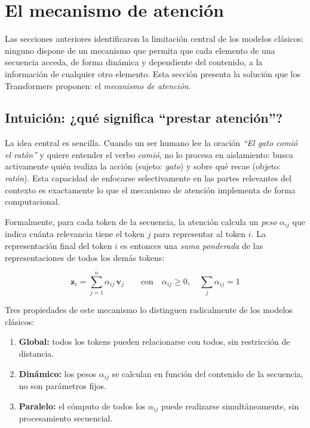 \section{El mecanismo de atención}
\label{sec:mecanismo_atencion}

Las secciones anteriores identificaron la limitación central de los modelos
clásicos: ninguno dispone de un mecanismo que permita que cada elemento de
una secuencia acceda, de forma dinámica y dependiente del contenido, a la
información de cualquier otro elemento. Esta sección presenta la solución
que los Transformers proponen: el \textit{mecanismo de atención}.

\subsection{Intuición: ¿qué significa ``prestar atención''?}
\label{subsec:atencion_intuicion}

La idea central es sencilla. Cuando un ser humano lee la oración
\textit{``El gato comió el ratón''} y quiere entender el verbo
\textit{comió}, no lo procesa en aislamiento: busca activamente quién
realiza la acción (sujeto: \textit{gato}) y sobre qué recae (objeto:
\textit{ratón}). Esta capacidad de enfocarse selectivamente en las partes
relevantes del contexto es exactamente lo que el mecanismo de atención
implementa de forma computacional.

Formalmente, para cada token de la secuencia, la atención calcula un
\textit{peso} $\alpha_{ij}$ que indica cuánta relevancia tiene el token $j$
para representar al token $i$. La representación final del token $i$ es
entonces una \textit{suma ponderada} de las representaciones de todos los
demás tokens:

\begin{equation}
    \bm{z}_i = \sum_{j=1}^{n} \alpha_{ij}\, \bm{v}_j
    \qquad \text{con} \quad \alpha_{ij} \geq 0, \quad \sum_j \alpha_{ij} = 1
\end{equation}



Tres propiedades de este mecanismo lo distinguen radicalmente de los modelos
clásicos:

\begin{enumerate}
    \item \textbf{Global:} todos los tokens pueden relacionarse con todos,
    sin restricción de distancia.
    \item \textbf{Dinámico:} los pesos $\alpha_{ij}$ se calculan en función
    del contenido de la secuencia, no son parámetros fijos.
    \item \textbf{Paralelo:} el cómputo de todos los $\alpha_{ij}$ puede
    realizarse simultáneamente, sin procesamiento secuencial.
\end{enumerate}

